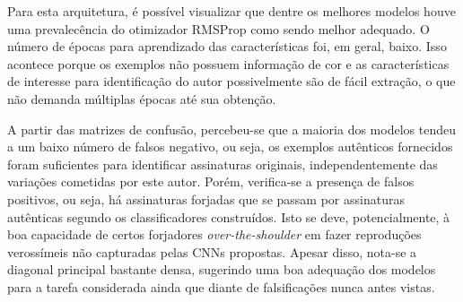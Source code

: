 Para esta arquitetura, é possível visualizar que dentre os melhores modelos houve uma prevalecência do otimizador RMSProp como sendo melhor adequado. O número de épocas para aprendizado das características foi, em geral, baixo. Isso acontece porque os exemplos não possuem informação de cor e as características de interesse para identificação do autor possivelmente são de fácil extração, o que não demanda múltiplas épocas até sua obtenção.

A partir das matrizes de confusão, percebeu-se que a  maioria dos modelos tendeu a um baixo número de falsos negativo, ou seja, os exemplos autênticos fornecidos foram suficientes para identificar assinaturas originais, independentemente das variações cometidas por este autor. Porém, verifica-se a presença de falsos positivos, ou seja,  há assinaturas forjadas que se passam por assinaturas autênticas segundo os classificadores construídos. Isto se deve, potencialmente, à boa capacidade de certos forjadores \emph{over-the-shoulder} em fazer reproduções verossímeis não capturadas pelas CNNs propostas. Apesar disso, nota-se a diagonal principal bastante densa, sugerindo uma boa adequação dos modelos para a tarefa considerada ainda que diante de falsificações nunca antes vistas.
